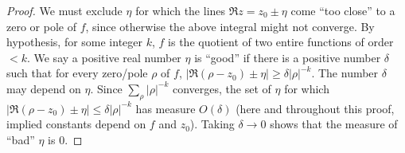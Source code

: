 \documentclass[10pt]{amsart}
\theoremstyle{remark}
\theoremstyle{plain}
\numberwithin{equation}{section}
\theoremstyle{definition}
\begin{document}
\begin{proof} We must exclude $\eta$ for which the lines $\Re z = z_0 
\pm \eta$ come ``too close'' to a zero or pole of $f$, since otherwise
 the above integral might not
converge.  By hypothesis, for some integer $k$, $f$ is the quotient of two
entire functions of order $<k$.  We say a positive real number $\eta$
 is ``good'' if there is a positive number $\delta$ such that
 for every zero/pole $\rho$ of $f$, $|\Re (\rho-z_0) \pm \eta| \ge
 \delta |\rho|^{-k}$.
The number $\delta$ may depend on $\eta$.  Since $\sum_\rho |\rho|^{-k}$ 
converges, the set of $\eta$ for which $|\Re (\rho-z_0)\pm \eta| \le \delta
|\rho|^{-k}$ has measure $O(\delta)$ (here and throughout this proof,
 implied constants depend on $f$ and $z_0$). 
Taking $\delta\to 0$ shows that the measure of ``bad'' $\eta$ is 0.


\end{proof}
\end{document}

